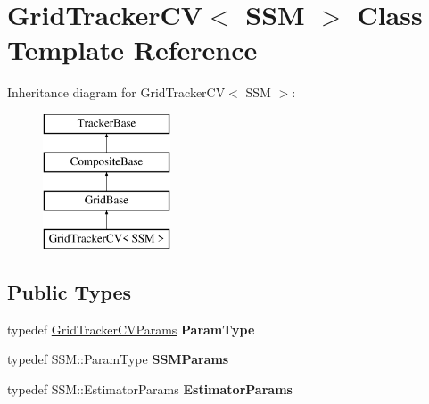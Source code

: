 \hypertarget{classGridTrackerCV}{\section{Grid\-Tracker\-C\-V$<$ S\-S\-M $>$ Class Template Reference}
\label{classGridTrackerCV}
}
Inheritance diagram for Grid\-Tracker\-C\-V$<$ S\-S\-M $>$\-:\begin{figure}[H]
\begin{center}
\leavevmode
\includegraphics[height=4.000000cm]{classGridTrackerCV}
\end{center}
\end{figure}
\subsection*{Public Types}
\begin{DoxyCompactItemize}
\item 
\hypertarget{classGridTrackerCV_ac7e3185b1f9865e5bff70a1f0ff03c50}{typedef \hyperlink{structGridTrackerCVParams}{Grid\-Tracker\-C\-V\-Params} {\bfseries Param\-Type}}\label{classGridTrackerCV_ac7e3185b1f9865e5bff70a1f0ff03c50}

\item 
\hypertarget{classGridTrackerCV_a520107d545de7def984e16b6fcf7432b}{typedef S\-S\-M\-::\-Param\-Type {\bfseries S\-S\-M\-Params}}\label{classGridTrackerCV_a520107d545de7def984e16b6fcf7432b}

\item 
\hypertarget{classGridTrackerCV_a8e1ad111aa30be76a1efce6a948b9e35}{typedef S\-S\-M\-::\-Estimator\-Params {\bfseries Estimator\-Params}}\label{classGridTrackerCV_a8e1ad111aa30be76a1efce6a948b9e35}

\end{DoxyCompactItemize}
